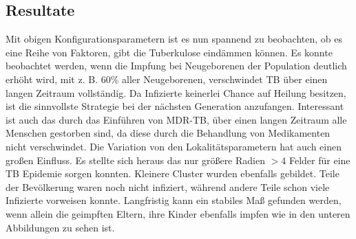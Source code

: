 \documentclass[paper=a4, fontsize=11pt, ngerman, abstract=on]{scrartcl}
\numberwithin{equation}{section} %
\numberwithin{figure}{section} %
\numberwithin{table}{section} %
\begin{document}
\subsection{Resultate}

Mit obigen Konfigurationsparametern ist es nun spannend zu beobachten, ob es eine Reihe von Faktoren, gibt die Tuberkulose eindämmen können. Es konnte beobachtet werden, wenn die Impfung bei Neugeborenen der Population deutlich erhöht wird, mit z. B. 60\% aller Neugeborenen, verschwindet TB über einen langen Zeitraum vollständig. Da Infizierte keinerlei Chance auf Heilung besitzen, ist die sinnvollste Strategie bei der nächsten Generation anzufangen. Interessant ist auch das durch das Einführen von MDR-TB, über einen langen Zeitraum alle Menschen gestorben sind, da diese durch die Behandlung von Medikamenten nicht verschwindet. Die Variation von den Lokalitätsparametern hat auch einen großen Einfluss. Es stellte sich heraus das nur größere Radien $> 4$ Felder für eine TB Epidemie sorgen konnten. Kleinere Cluster wurden ebenfalls gebildet. Teile der Bevölkerung waren noch nicht infiziert, während andere Teile schon viele Infizierte vorweisen konnte. Langfristig kann ein stabiles Maß gefunden werden, wenn allein die geimpften Eltern, ihre Kinder ebenfalls impfen wie in den unteren Abbildungen zu sehen ist.
\end{document}
